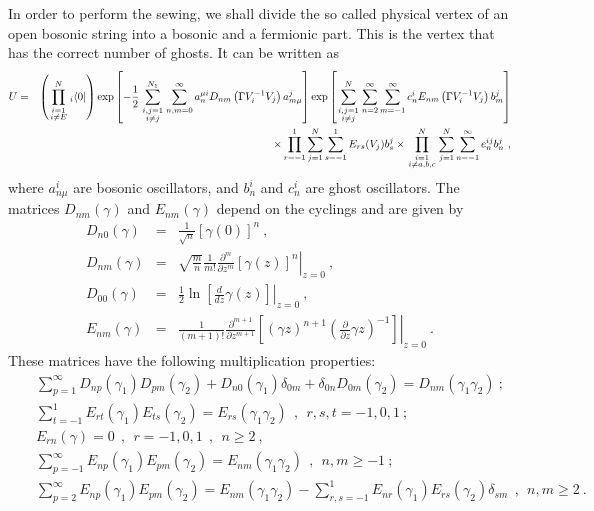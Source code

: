 \documentclass[a4paper,11pt]{article}
\begin{document}
In order to perform the sewing, we shall divide the so called physical vertex \cite{pw3} of an open bosonic string into a bosonic and a fermionic part. This is the vertex that has the correct number of ghosts. It can be written as
\begin{eqnarray}
U & = & \left( \prod_{\scriptstyle i=1\atop \scriptstyle i\neq E}^{N}{ }_i\langle 0|\right) \exp \left[ -\frac{1}{2}\sum_{\scriptstyle i,j=1\atop \scriptstyle i\neq j}^{N_1}\sum_{n,m=0}^\infty a^{\mu i}_nD_{nm}\left( \Gamma V^{-1}_iV_j\right) a^j_{m\mu }\right] \exp \left[ \sum_{\scriptstyle i,j=1\atop \scriptstyle i\neq j}^N\sum_{n=2}^\infty \sum_{m=-1}^\infty c_n^iE_{nm}\left( \Gamma V^{-1}_iV_j\right) b_m^j\right] \nonumber \\ 
\label{eq1}
 & & \times \prod_{r=-1}^1\sum_{j=1}^N\sum_{s=-1}^1E_{rs}(V_j)b_s^j\times \prod_{\scriptstyle i=1\atop \scriptstyle i\neq a,b,c}^N\sum_{j=1}^N\sum_{n=-1}^\infty e_n^{ij}b_n^j\ ,
\end{eqnarray}
where $a^i_{n\mu }$ are bosonic oscillators, and $b^i_n$ and $c^i_n$ are ghost oscillators. The matrices $D_{nm}(\gamma )$ and $E_{nm}(\gamma )$ depend on the cyclings and are given by \cite{cg1} \cite{cg2}
\begin{eqnarray}
D_{n0}(\gamma ) & = & \frac{1}{\sqrt{n}}\left[ \gamma (0)\right] ^n\ ,\\
D_{nm}(\gamma ) & = & \left. \sqrt{\frac{m}{n}}\frac{1}{m!}\frac{\partial ^m}
{\partial z^m}\left[ \gamma (z)\right] ^n\right| _{z=0}\ ,\\
D_{00}(\gamma) & = & \left. \frac{1}{2}\ln \left[ \frac{d}{dz}\gamma (z)\right] \right| _{z=0}\ ,\\ 
E_{nm}(\gamma ) & = & \left. \frac{1}{(m+1)!}\frac{\partial ^{m+1}}{\partial z^{m+1}}\left[
\left( \gamma z\right) ^{n+1}\left( \frac{\partial }{\partial z}\gamma z\right) ^{-1}\right]
\right| _{z=0}\ .
\end{eqnarray}
These matrices have the following multiplication properties:
\begin{eqnarray}
\label{eq3}
 & & \sum_{p=1}^\infty D_{np}(\gamma _1)D_{pm}(\gamma _2)+D_{n0}
(\gamma _1)\delta _{0m}+\delta _{0n}D_{0m}(\gamma _2)=D_{nm}(\gamma _1\gamma _2)\ ;\\ 
\label{eq4}
 & & \sum_{t=-1}^1E_{rt}(\gamma _1)E_{ts}(\gamma _2)=E_{rs}(\gamma _1\gamma _2)\ \ ,\ \
r,s,t=-1,0,1\ ;\\
\label{eq5}
 & & E_{rn}(\gamma )=0\ \ ,\ \ r=-1,0,1\ \ ,\ \ n\geq 2\ ,\\
 & & \sum_{p=-1}^\infty E_{np}(\gamma _1)E_{pm}(\gamma _2)=E_{nm}(\gamma _1\gamma _2)\ \ ,\ \ n,m\geq -1\ ;\\
\label{eq6}
 & & \sum_{p=2}^\infty E_{np}(\gamma _1)E_{pm}(\gamma _2)=E_{nm}(\gamma _1\gamma _2)
-\sum_{r,s=-1}^1E_{nr}(\gamma _1)E_{rs}(\gamma _2)\delta _{sm}\ \ ,\ \ n,m\geq 2\ .
\end{eqnarray}
\end{document}
